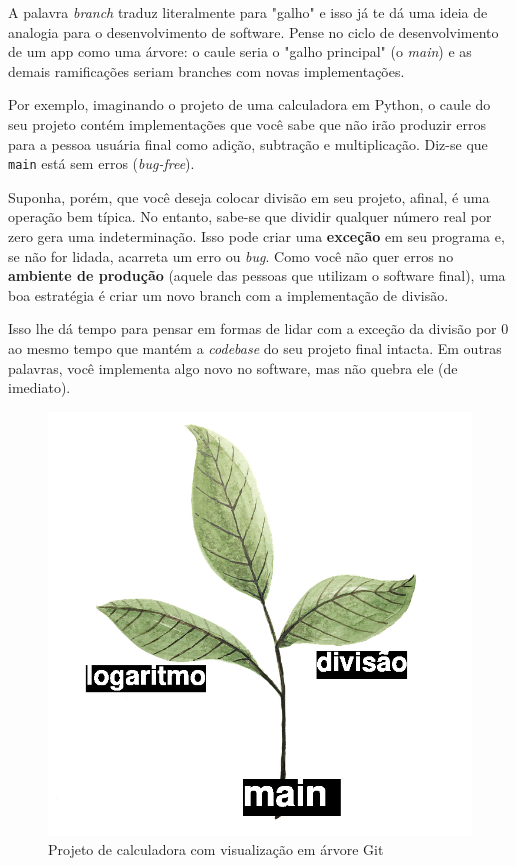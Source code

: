\documentclass{article}
\begin{document}
	A palavra \textit{branch} traduz literalmente para "galho" e isso já te dá uma ideia de analogia para o desenvolvimento de 
	software. Pense no ciclo de desenvolvimento de um app como uma árvore: o caule seria o "galho principal" (o \textit{main})
	e as demais ramificações seriam branches com novas implementações.

	Por exemplo, imaginando o projeto de uma calculadora em Python, o caule do seu projeto contém implementações que você sabe 
	que não irão produzir erros para a pessoa usuária final como adição, subtração e multiplicação. Diz-se que \texttt{main} 
	está sem erros (\textit{bug-free}).
	
	Suponha, porém, que você deseja colocar divisão em seu projeto, afinal, é uma operação bem típica. No entanto, sabe-se que dividir
	qualquer número real por zero gera uma indeterminação. Isso pode criar uma \textbf{exceção} em seu programa e, se não for lidada, 
	acarreta um erro ou \textit{bug}. Como você não quer erros no \textbf{ambiente de produção} (aquele das pessoas que utilizam o software final),
	uma boa estratégia é criar um novo branch com a implementação de divisão. 

	Isso lhe dá tempo para pensar em formas de lidar com a exceção da divisão por 0 ao mesmo tempo que mantém a \textit{codebase}
	do seu projeto final intacta. Em outras palavras, você implementa algo novo no software, mas não quebra ele (de imediato).

	\begin{figure}[ht!]
		\centering
	  	\includegraphics[scale=0.3]{figs/software_tree.png} 
		\caption*{Projeto de calculadora com visualização em árvore Git}
  	\end{figure}
\end{document}
